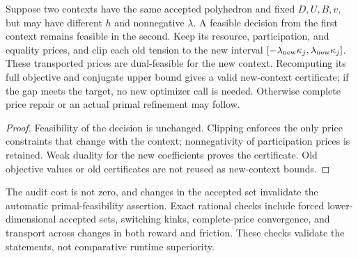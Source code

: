 \begin{corollary}\label{cor:r22-transport}
Suppose two contexts have the same accepted polyhedron and fixed $D,U,B,v$, but may have different $h$ and nonnegative $\lambda$. A feasible decision from the first context remains feasible in the second. Keep its resource, participation, and equality prices, and clip each old tension to the new interval $[-\lambda_{\rm new}\kappa_j,\lambda_{\rm new}\kappa_j]$. These transported prices are dual-feasible for the new context. Recomputing its full objective and conjugate upper bound gives a valid new-context certificate; if the gap meets the target, no new optimizer call is needed. Otherwise complete price repair or an actual primal refinement may follow.
\end{corollary}
\begin{proof}
Feasibility of the decision is unchanged. Clipping enforces the only price constraints that change with the context; nonnegativity of participation prices is retained. Weak duality for the new coefficients proves the certificate. Old objective values or old certificates are not reused as new-context bounds.
\end{proof}
The audit cost is not zero, and changes in the accepted set invalidate the automatic primal-feasibility assertion. Exact rational checks include forced lower-dimensional accepted sets, switching kinks, complete-price convergence, and transport across changes in both reward and friction. These checks validate the statements, not comparative runtime superiority.
